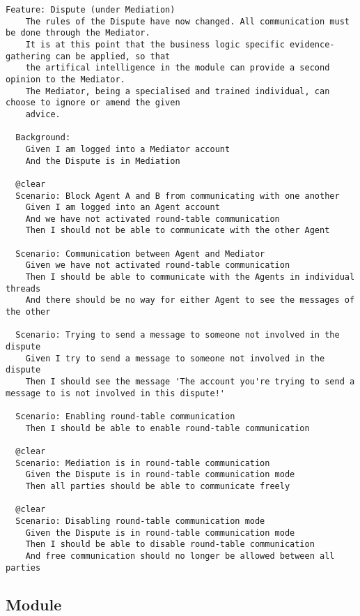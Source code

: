 \begin{lstlisting}
Feature: Dispute (under Mediation)
    The rules of the Dispute have now changed. All communication must be done through the Mediator.
    It is at this point that the business logic specific evidence-gathering can be applied, so that
    the artifical intelligence in the module can provide a second opinion to the Mediator.
    The Mediator, being a specialised and trained individual, can choose to ignore or amend the given
    advice.

  Background:
    Given I am logged into a Mediator account
    And the Dispute is in Mediation

  @clear
  Scenario: Block Agent A and B from communicating with one another
    Given I am logged into an Agent account
    And we have not activated round-table communication
    Then I should not be able to communicate with the other Agent

  Scenario: Communication between Agent and Mediator
    Given we have not activated round-table communication
    Then I should be able to communicate with the Agents in individual threads
    And there should be no way for either Agent to see the messages of the other

  Scenario: Trying to send a message to someone not involved in the dispute
    Given I try to send a message to someone not involved in the dispute
    Then I should see the message 'The account you're trying to send a message to is not involved in this dispute!'

  Scenario: Enabling round-table communication
    Then I should be able to enable round-table communication

  @clear
  Scenario: Mediation is in round-table communication
    Given the Dispute is in round-table communication mode
    Then all parties should be able to communicate freely

  @clear
  Scenario: Disabling round-table communication mode
    Given the Dispute is in round-table communication mode
    Then I should be able to disable round-table communication
    And free communication should no longer be allowed between all parties

\end{lstlisting}

\subsection{Module}

